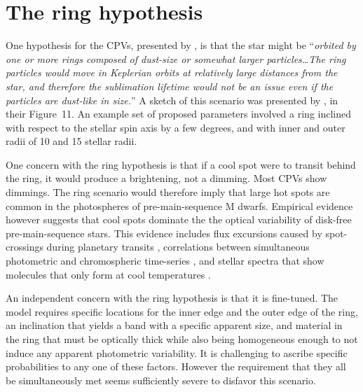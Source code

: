 \documentclass[11pt,twocolumn,tighten]{aastex63}
\begin{document}

\appendix

\section{The ring hypothesis}
\label{app:ring}

One hypothesis for the CPVs, presented by \citet{2019ApJ...876..127Z},
is that the star might be ``{\it orbited by one or more rings composed
of dust-size or somewhat larger particles\ldots The ring particles
would move in Keplerian orbits at relatively large distances from the
star, and therefore the sublimation lifetime would not be an issue
even if the particles are dust-like in size.}'' A sketch of this
scenario was presented by \citet{2019ApJ...876..127Z}, in their
Figure~11.  An example set of proposed parameters involved a ring
inclined with respect to the stellar spin axis by a few degrees, and
with inner and outer radii of 10 and 15 stellar radii.

One concern with the ring hypothesis is that if a cool spot were to
transit behind the ring, it would produce a brightening, not a
dimming.   Most CPVs show dimmings.   The ring scenario would therefore
imply that large hot spots are common in the photospheres of
pre-main-sequence M dwarfs.  Empirical evidence however suggests that
cool spots dominate the the optical variability of disk-free
pre-main-sequence stars.  This evidence includes flux excursions
caused by spot-crossings during planetary transits
\citep[e.g.][]{2020AJ....160...33R,2022AJ....163..147G}, correlations
between simultaneous photometric and chromospheric time-series
\citep{2019A&A...621A..21R}, and stellar spectra that show molecules
that only form at cool temperatures
\citep[e.g.][]{2017ApJ...836..200G,2023ApJ...946...10P}.

An independent  concern with the ring hypothesis is that it is
fine-tuned.  The model requires specific locations for the inner edge
and the outer edge of the ring, an inclination that yields a band with
a specific apparent size, and material in the ring that must be
optically thick while also being homogeneous enough to not induce any
apparent photometric variability.  It is challenging to ascribe
specific probabilities to any one of these factors.  However the
requirement that they all be simultaneously met seems sufficiently
severe to disfavor this scenario.
\end{document}
